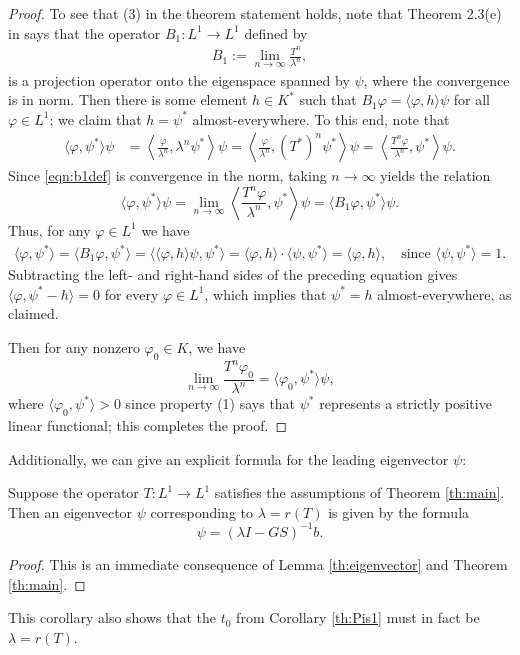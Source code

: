 \begin{proof}
	To see that (3) in the theorem statement holds, note that Theorem 2.3(e) in \cite{Marek1970} says that the operator $B_1:L^1 \to L^1$ defined by
	\begin{align}
		B_1 := \lim_{n \to \infty} \frac{T^n}{\lambda^n}, \label{eqn:b1def}
	\end{align}
	is a projection operator onto the eigenspace spanned by $\psi$, where the convergence is in norm. Then there is some element $h \in K^*$ such that $B_1 \varphi = \langle \varphi, h \rangle \psi$ for all $\varphi \in L^1$; we claim that $h = \psi^*$ almost-everywhere. To this end, note that
	\begin{align*}
		\langle \varphi, \psi^* \rangle \psi &= \left \langle \frac{\varphi}{\lambda^n}, \lambda^n \psi^* \right \rangle \psi = \left \langle \frac{\varphi}{\lambda^n}, (T^*)^n \psi^* \right \rangle \psi = \left \langle \frac{T^n \varphi}{\lambda^n}, \psi^* \right \rangle \psi.
	\end{align*}
	Since \eqref{eqn:b1def} is convergence in the norm, taking $n \to \infty$ yields the relation
	\[\langle \varphi, \psi^* \rangle \psi = \lim_{n \to \infty} \left \langle \frac{T^n \varphi}{\lambda^n}, \psi^* \right \rangle \psi = \langle B_1 \varphi, \psi^* \rangle \psi.\]
	Thus, for any $\varphi \in L^1$ we have
	\begin{align*}
		\langle \varphi, \psi^* \rangle = \langle B_1 \varphi, \psi^* \rangle = \langle \langle \varphi, h \rangle \psi, \psi^* \rangle = \langle \varphi, h \rangle \cdot \langle \psi, \psi^* \rangle = \langle \varphi, h \rangle, \quad \text{since } \langle \psi, \psi^* \rangle = 1.
	\end{align*}
	Subtracting the left- and right-hand sides of the preceding equation gives $\langle \varphi, \psi^* - h \rangle = 0$ for every $\varphi \in L^1$, which implies that $\psi^* = h$ almost-everywhere, as claimed.
	
	Then for any nonzero $\varphi_0 \in K$, we have
	\[\lim_{n \to \infty} \frac{T^n \varphi_0}{\lambda^n} = \langle \varphi_0, \psi^* \rangle \psi,\]
	where $\langle \varphi_0, \psi^* \rangle > 0$ since property (1) says that $\psi^*$ represents a strictly positive linear functional; this completes the proof. 
	
\end{proof}

Additionally, we can give an explicit formula for the leading eigenvector $\psi$:

\begin{corollary} \label{th:existenceofevector}
	Suppose the operator $T:L^1 \to L^1$ satisfies the assumptions of Theorem \ref{th:main}. Then an eigenvector $\psi$ corresponding to $\lambda = r(T)$ is given by the formula
	\[\psi = (\lambda I - GS)^{-1}b.\]
\end{corollary}

\begin{proof}
	This is an immediate consequence of Lemma \ref{th:eigenvector} and Theorem \ref{th:main}.
\end{proof}

This corollary also shows that the $t_0$ from Corollary \ref{th:Pis1} must in fact be $\lambda = r(T)$.